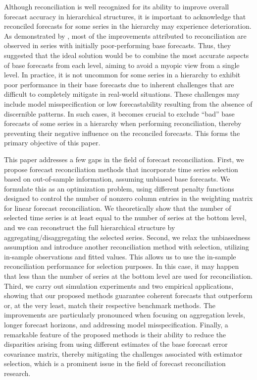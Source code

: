 \documentclass[11pt,a4paper,]{article}
\begin{document}
Although reconciliation is well recognized for its ability to improve
overall forecast accuracy in hierarchical structures, it is important to
acknowledge that reconciled forecasts for some series in the hierarchy
may experience deterioration. As demonstrated by
\textcite{Athanasopoulos2017-jj}, most of the improvements attributed to
reconciliation are observed in series with initially poor-performing
base forecasts. Thus, they suggested that the ideal solution would be to
combine the most accurate aspects of base forecasts from each level,
aiming to avoid a myopic view from a single level. In practice, it is
not uncommon for some series in a hierarchy to exhibit poor performance
in their base forecasts due to inherent challenges that are difficult to
completely mitigate in real-world situations. These challenges may
include model misspecification or low forecastability resulting from the
absence of discernible patterns. In such cases, it becomes crucial to
exclude ``bad'' base forecasts of some series in a hierarchy when
performing reconciliation, thereby preventing their negative influence
on the reconciled forecasts. This forms the primary objective of this
paper.

This paper addresses a few gaps in the field of forecast reconciliation.
First, we propose forecast reconciliation methods that incorporate time
series selection based on out-of-sample information, assuming unbiased
base forecasts. We formulate this as an optimization problem, using
different penalty functions designed to control the number of nonzero
column entries in the weighting matrix for linear forecast
reconciliation. We theoretically show that the number of selected time
series is at least equal to the number of series at the bottom level,
and we can reconstruct the full hierarchical structure by
aggregating/disaggregating the selected series. Second, we relax the
unbiasedness assumption and introduce another reconciliation method with
selection, utilizing in-sample observations and fitted values. This
allows us to use the in-sample reconciliation performance for selection
purposes. In this case, it may happen that less than the number of
series at the bottom level are used for reconciliation. Third, we carry
out simulation experiments and two empirical applications, showing that
our proposed methods guarantee coherent forecasts that outperform or, at
the very least, match their respective benchmark methods. The
improvements are particularly pronounced when focusing on aggregation
levels, longer forecast horizons, and addressing model misspecification.
Finally, a remarkable feature of the proposed methods is their ability
to reduce the disparities arising from using different estimates of the
base forecast error covariance matrix, thereby mitigating the challenges
associated with estimator selection, which is a prominent issue in the
field of forecast reconciliation research.
\end{document}
